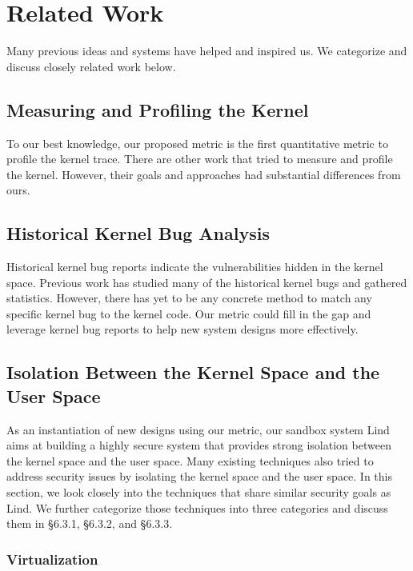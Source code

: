 \section{Related Work}
\label{sec.related_work}

Many previous ideas and systems have helped and inspired us. We categorize and discuss closely related work below.


\subsection{Measuring and Profiling the Kernel}

To our best knowledge, our proposed metric is the first quantitative metric to profile the kernel trace. 
There are other work that tried to measure and profile the kernel. However, their goals and approaches 
had substantial differences from ours.


\subsection{Historical Kernel Bug Analysis}
Historical kernel bug reports indicate the vulnerabilities hidden in the kernel space. 
Previous work has studied many of the historical kernel bugs and gathered statistics. 
However, there has yet to be any concrete method to match any specific kernel bug to the kernel code.  
Our metric could fill in the gap and leverage kernel bug reports to help new system designs more effectively.

\subsection{Isolation Between the Kernel Space and the User Space}

As an instantiation of new designs using our metric, our sandbox system Lind aims at building a highly secure system 
that provides strong isolation between the kernel space and the user space. Many existing techniques also tried to 
address security issues by isolating the kernel space and the user space. In this section, we look closely into the techniques 
that share similar security goals as Lind. We further categorize those techniques into three categories and discuss them 
in \S{6.3.1}, \S{6.3.2}, and \S{6.3.3}. 

\subsubsection{Virtualization}


